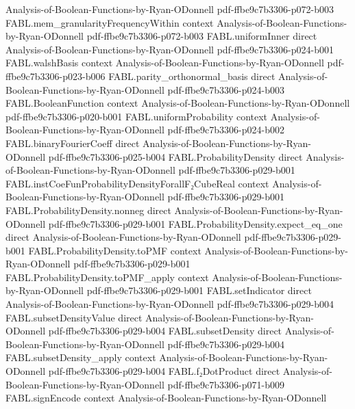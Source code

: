 \begin{theorem}
  {Analysis-of-Boolean-Functions-by-Ryan-ODonnell}
  {pdf-ffbe9c7b3306-p072-b003}
\proofstep
  {FABL.mem_granularityFrequencyWithin}
  {context}
  {Analysis-of-Boolean-Functions-by-Ryan-ODonnell}
  {pdf-ffbe9c7b3306-p072-b003}
\proofstep
  {FABL.uniformInner}
  {direct}
  {Analysis-of-Boolean-Functions-by-Ryan-ODonnell}
  {pdf-ffbe9c7b3306-p024-b001}
\proofstep
  {FABL.walshBasis}
  {context}
  {Analysis-of-Boolean-Functions-by-Ryan-ODonnell}
  {pdf-ffbe9c7b3306-p023-b006}
\proofstep
  {FABL.parity_orthonormal_basis}
  {direct}
  {Analysis-of-Boolean-Functions-by-Ryan-ODonnell}
  {pdf-ffbe9c7b3306-p024-b003}
\proofstep
  {FABL.BooleanFunction}
  {context}
  {Analysis-of-Boolean-Functions-by-Ryan-ODonnell}
  {pdf-ffbe9c7b3306-p020-b001}
\proofstep
  {FABL.uniformProbability}
  {context}
  {Analysis-of-Boolean-Functions-by-Ryan-ODonnell}
  {pdf-ffbe9c7b3306-p024-b002}
\proofstep
  {FABL.binaryFourierCoeff}
  {direct}
  {Analysis-of-Boolean-Functions-by-Ryan-ODonnell}
  {pdf-ffbe9c7b3306-p025-b004}
\proofstep
  {FABL.ProbabilityDensity}
  {direct}
  {Analysis-of-Boolean-Functions-by-Ryan-ODonnell}
  {pdf-ffbe9c7b3306-p029-b001}
\proofstep
  {FABL.instCoeFunProbabilityDensityForallF₂CubeReal}
  {context}
  {Analysis-of-Boolean-Functions-by-Ryan-ODonnell}
  {pdf-ffbe9c7b3306-p029-b001}
\proofstep
  {FABL.ProbabilityDensity.nonneg}
  {direct}
  {Analysis-of-Boolean-Functions-by-Ryan-ODonnell}
  {pdf-ffbe9c7b3306-p029-b001}
\proofstep
  {FABL.ProbabilityDensity.expect_eq_one}
  {direct}
  {Analysis-of-Boolean-Functions-by-Ryan-ODonnell}
  {pdf-ffbe9c7b3306-p029-b001}
\proofstep
  {FABL.ProbabilityDensity.toPMF}
  {context}
  {Analysis-of-Boolean-Functions-by-Ryan-ODonnell}
  {pdf-ffbe9c7b3306-p029-b001}
\proofstep
  {FABL.ProbabilityDensity.toPMF_apply}
  {context}
  {Analysis-of-Boolean-Functions-by-Ryan-ODonnell}
  {pdf-ffbe9c7b3306-p029-b001}
\proofstep
  {FABL.setIndicator}
  {direct}
  {Analysis-of-Boolean-Functions-by-Ryan-ODonnell}
  {pdf-ffbe9c7b3306-p029-b004}
\proofstep
  {FABL.subsetDensityValue}
  {direct}
  {Analysis-of-Boolean-Functions-by-Ryan-ODonnell}
  {pdf-ffbe9c7b3306-p029-b004}
\proofstep
  {FABL.subsetDensity}
  {direct}
  {Analysis-of-Boolean-Functions-by-Ryan-ODonnell}
  {pdf-ffbe9c7b3306-p029-b004}
\proofstep
  {FABL.subsetDensity_apply}
  {context}
  {Analysis-of-Boolean-Functions-by-Ryan-ODonnell}
  {pdf-ffbe9c7b3306-p029-b004}
\proofstep
  {FABL.f₂DotProduct}
  {direct}
  {Analysis-of-Boolean-Functions-by-Ryan-ODonnell}
  {pdf-ffbe9c7b3306-p071-b009}
\proofstep
  {FABL.signEncode}
  {context}
  {Analysis-of-Boolean-Functions-by-Ryan-ODonnell}

\end{theorem}
